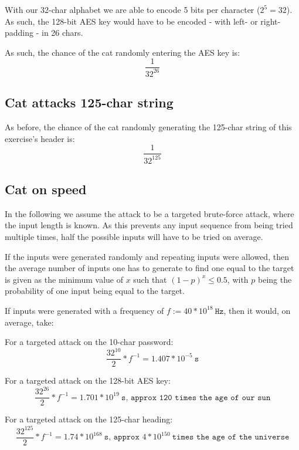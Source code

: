 \documentclass[a4paper]{scrreprt}
\begin{document}
With our 32-char alphabet we are able to encode 5 bits per character ($2^5 =
32$). As such, the 128-bit AES key would have to be encoded - with left- or
right-padding - in 26 chars.

As such, the chance of the cat randomly entering the AES key is:
\[
	\frac{1}{32^{26}}
\]

\subsection{Cat attacks 125-char string}

As before, the chance of the cat randomly generating the 125-char string of this exercise's header is:
\[
	\frac{1}{32^{125}}
\]

\subsection{Cat on speed}

In the following we assume the attack to be a targeted brute-force attack,
where the input length is known. As this prevents any input sequence from being
tried multiple times, half the possible inputs will have to be tried on
average.

If the inputs were generated randomly and repeating inputs were allowed, then
the average number of inputs one has to generate to find one equal to the
target is given as the minimum value of $x$ such that $(1-p)^x \leq 0.5$, with
$p$ being the probability of one input being equal to the target.

If inputs were generated with a frequency of $f := 40 * 10^{18}\ \texttt{Hz}$,
then it would, on average, take:

For a targeted attack on the 10-char password:
\[
	\frac{32^{10}}{2} * f^{-1} = 1.407 * 10^{-5}\ \texttt{s}
\]


For a targeted attack on the 128-bit AES key:
\[
	\frac{32^{26}}{2} * f^{-1} = 1.701 * 10^{19}\ \texttt{s, approx 120 times the age of our sun}
\]


For a targeted attack on the 125-char heading:
\[
	\frac{32^{125}}{2} * f^{-1} = 1.74 * 10^{168}\ \texttt{s, approx } 4 * 10^{150}\ \texttt{times the age of the universe}
\]
\end{document}
